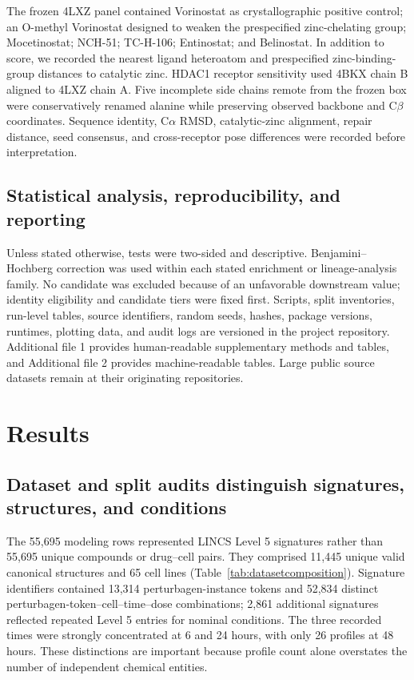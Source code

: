 The frozen 4LXZ panel contained Vorinostat as crystallographic positive control; an O-methyl Vorinostat designed to weaken the prespecified zinc-chelating group; Mocetinostat; NCH-51; TC-H-106; Entinostat; and Belinostat. In addition to score, we recorded the nearest ligand heteroatom and prespecified zinc-binding-group distances to catalytic zinc. HDAC1 receptor sensitivity used 4BKX chain B aligned to 4LXZ chain A. Five incomplete side chains remote from the frozen box were conservatively renamed alanine while preserving observed backbone and C$\beta$ coordinates. Sequence identity, C$\alpha$ RMSD, catalytic-zinc alignment, repair distance, seed consensus, and cross-receptor pose differences were recorded before interpretation.

\subsection{Statistical analysis, reproducibility, and reporting}

Unless stated otherwise, tests were two-sided and descriptive. Benjamini--Hochberg correction was used within each stated enrichment or lineage-analysis family. No candidate was excluded because of an unfavorable downstream value; identity eligibility and candidate tiers were fixed first. Scripts, split inventories, run-level tables, source identifiers, random seeds, hashes, package versions, runtimes, plotting data, and audit logs are versioned in the project repository. Additional file 1 provides human-readable supplementary methods and tables, and Additional file 2 provides machine-readable tables. Large public source datasets remain at their originating repositories.

\section{Results}

\subsection{Dataset and split audits distinguish signatures, structures, and conditions}

The 55,695 modeling rows represented LINCS Level 5 signatures rather than 55,695 unique compounds or drug--cell pairs. They comprised 11,445 unique valid canonical structures and 65 cell lines (Table~\ref{tab:datasetcomposition}). Signature identifiers contained 13,314 perturbagen-instance tokens and 52,834 distinct perturbagen-token--cell--time--dose combinations; 2,861 additional signatures reflected repeated Level 5 entries for nominal conditions. The three recorded times were strongly concentrated at 6 and 24 hours, with only 26 profiles at 48 hours. These distinctions are important because profile count alone overstates the number of independent chemical entities.

